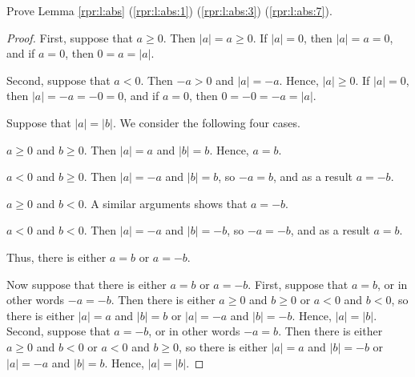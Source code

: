 \Newpage
\begin{exercise} %
	Prove Lemma \ref{rpr:l:abs} (\ref{rpr:l:abs:1}) (\ref{rpr:l:abs:3}) (\ref{rpr:l:abs:7}).
\end{exercise}

\begin{proof}
	\hfill

	First, suppose that $a \geq 0$. Then $|a| = a \geq 0$. If $|a| = 0$, then $|a| = a = 0$, and if $a = 0$, then $0 = a = |a|$.

	Second, suppose that $a < 0$. Then $-a > 0$ and $|a| = -a$. Hence, $|a| \geq 0$. If $|a| = 0$, then $|a| = -a = -0 = 0$, and if $a = 0$, then $0 = -0 = -a = |a|$.

	Suppose that $|a| = |b|$. We consider the following four cases.
	\begin{bycases}
		\item $a \geq 0$ and $b \geq 0$. Then $|a| = a$ and $|b| = b$. Hence, $a = b$.
		\item $a < 0$ and $b \geq 0$. Then $|a| = -a$ and $|b| = b$, so $-a = b$, and as a result $a = -b$.
		\item $a \geq 0$ and $b < 0$. A similar arguments shows that $a = -b$.
		\item $a < 0$ and $b < 0$. Then $|a| = -a$ and $|b| = -b$, so $-a = -b$, and as a result $a = b$.
	\end{bycases}
	Thus, there is either $a = b$ or $a = -b$.

	Now suppose that there is either $a = b$ or $a = -b$. First, suppose that $a = b$, or in other words $-a = -b$. Then there is either $a \geq 0$ and $b \geq 0$ or $a < 0$ and $b < 0$, so there is either $|a| = a$ and $|b| = b$ or $|a| = -a$ and $|b| = -b$. Hence, $|a| = |b|$. Second, suppose that $a = -b$, or in other words $-a = b$. Then there is either $a \geq 0$ and $b < 0$ or $a < 0$ and $b \geq 0$, so there is either $|a| = a$ and $|b| = -b$ or $|a| = -a$ and $|b| = b$. Hence, $|a| = |b|$.


\end{proof}
